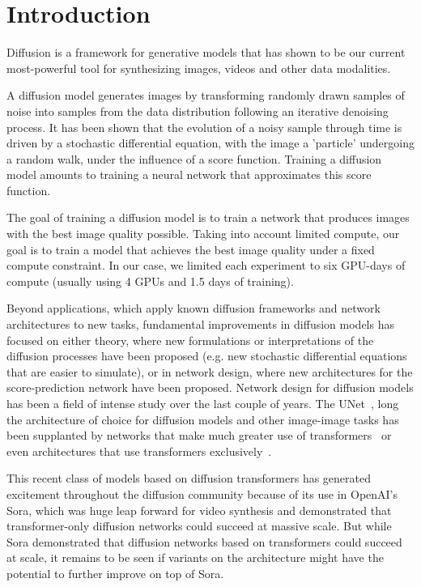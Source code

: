 \section{Introduction}

Diffusion is a framework for generative models that has shown
to be our current most-powerful tool for synthesizing images, videos
and other data modalities.

A diffusion model generates images by transforming randomly drawn
samples of noise into samples from the data distribution following
an iterative denoising process. It has been shown that the evolution
of a noisy sample through time is driven by a stochastic differential
equation, with the image a 'particle' undergoing a random walk, under
the influence of a score function. Training a diffusion model amounts
to training a neural network that approximates this score function.


The goal of training a diffusion model is to train a network
that produces images with the best image quality possible.
Taking into account limited compute, our goal is to train a model
that achieves the best image quality under a fixed compute constraint.
In our case, we limited each experiment to six GPU-days of compute
(usually using 4 GPUs and 1.5 days of training).


Beyond applications, which apply known
diffusion frameworks and network architectures to new tasks, fundamental
improvements in diffusion models has focused on either theory, where new
formulations or interpretations of the diffusion processes have been proposed
(e.g. new stochastic differential equations that are easier to simulate), or in
network design, where new architectures for the score-prediction network
have been proposed. Network design for diffusion models has been a
field of intense study over the last couple of years. The UNet~\cite{?},
long the architecture of choice for diffusion models and other image-image tasks
has been supplanted by networks that make much greater use of transformers~\cite{sdxl, uvit}
or even architectures that use transformers exclusively~\cite{DiT}.

This recent class of models based on diffusion transformers has generated
excitement throughout the diffusion community because of its use
in OpenAI's Sora, which was huge leap forward for video synthesis and
demonstrated that transformer-only diffusion networks could succeed at massive
scale. But while Sora demonstrated that diffusion networks based on transformers could
succeed at scale, it remains to be seen if variants on the architecture might
have the potential to further improve on top of Sora.

